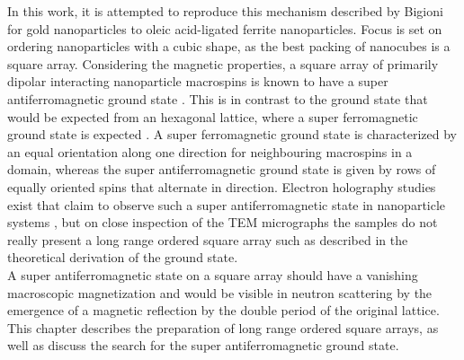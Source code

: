 \documentclass[\main/dresen_thesis.tex]{subfiles}
\begin{document}
  In this work, it is attempted to reproduce this mechanism described by Bigioni for gold nanoparticles to oleic acid-ligated ferrite nanoparticles.
  Focus is set on ordering nanoparticles with a cubic shape, as the best packing of nanocubes is a square array.
  Considering the magnetic properties, a square array of primarily dipolar interacting nanoparticle macrospins is known to have a super antiferromagnetic ground state \cite{Russier_2001_Calcu}.
  This is in contrast to the ground state that would be expected from an hexagonal lattice, where a super ferromagnetic ground state is expected \cite{Russier_2001_Calcu}.
  A super ferromagnetic ground state is characterized by an equal orientation along one direction for neighbouring macrospins in a domain, whereas the super antiferromagnetic ground state is given by rows of equally oriented spins that alternate in direction.
  Electron holography studies exist that claim to observe such a super antiferromagnetic state in nanoparticle systems \cite{Varon_2013_Dipol}, but on close inspection of the TEM micrographs the samples do not really present a long range ordered square array such as described in the theoretical derivation of the ground state.
  \\

  A super antiferromagnetic state on a square array should have a vanishing macroscopic magnetization and would be visible in neutron scattering by the emergence of a magnetic reflection by the double period of the original lattice.
  This chapter describes the preparation of long range ordered square arrays, as well as discuss the search for the super antiferromagnetic ground state.
\end{document}
